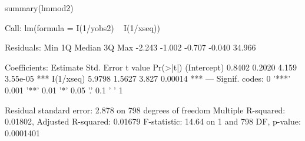 \begin{Schunk}
\begin{Sinput}
 summary(lmmod2)
\end{Sinput}
\begin{Soutput}
Call:
lm(formula = I(1/yobs2) ~ I(1/xseq))

Residuals:
   Min     1Q Median     3Q    Max 
-2.243 -1.002 -0.707 -0.040 34.966 

Coefficients:
            Estimate Std. Error t value Pr(>|t|)    
(Intercept)   0.8402     0.2020   4.159 3.55e-05 ***
I(1/xseq)     5.9798     1.5627   3.827  0.00014 ***
---
Signif. codes:  0 '***' 0.001 '**' 0.01 '*' 0.05 '.' 0.1 ' ' 1

Residual standard error: 2.878 on 798 degrees of freedom
Multiple R-squared:  0.01802,	Adjusted R-squared:  0.01679 
F-statistic: 14.64 on 1 and 798 DF,  p-value: 0.0001401
\end{Soutput}
\begin{Sinput}
 
\end{Sinput}
\end{Schunk}
